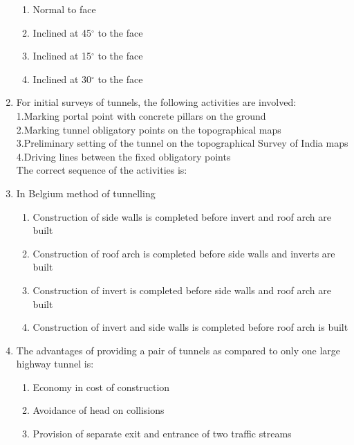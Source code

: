 \documentclass[11pt,a4paper]{article}
\begin{document}
\begin{enumerate}
\begin{enumerate}[label=\Alph*.]
\item{Normal to face}
\item{Inclined at 45$^\circ$ to the face}
\item{Inclined at 15$^\circ$ to the face}
\item{Inclined at 30$^\circ$ to the face}
\end{enumerate}
\item{For initial surveys of tunnels, the following activities are involved: \\
1.Marking portal point with concrete pillars on the ground \\
2.Marking tunnel obligatory points on the topographical maps \\
3.Preliminary setting of the tunnel on the topographical Survey of India maps \\
4.Driving lines between the fixed obligatory points \\
The correct sequence of the activities is:}
\\
\item{In Belgium method of tunnelling}
\begin{enumerate}[label=\Alph*.]
\item{Construction of side walls is completed before invert and roof arch are built}
\item{Construction of roof arch is completed before side walls and inverts are built}
\item{Construction of invert is completed before side walls and roof arch are built}
\item{Construction of invert and side walls is completed before roof arch is built}
\end{enumerate}
\item{The advantages of providing a pair of tunnels as compared to only one large highway tunnel is:}
\begin{enumerate}[label=\Alph*.]
\item{Economy in cost of construction}
\item{Avoidance of head on collisions}
\item{Provision of separate exit and entrance of two traffic streams}

\end{enumerate}
\end{enumerate}
\end{document}
